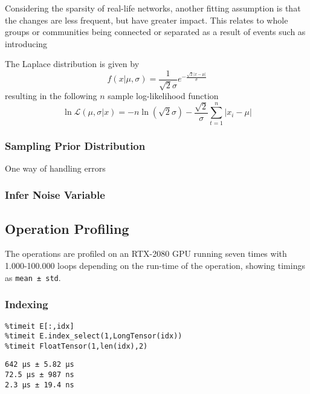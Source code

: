    Considering the sparsity of real-life networks, another fitting assumption is that the changes are less frequent, but have greater impact. This relates to whole groups or communities being connected or separated as a result of events such as introducing 
    

    The Laplace distribution is given by
    \begin{equation}
        f(x\vert\mu,\sigma)=\frac{1}{\sqrt{2}\sigma}e^{-\frac{\sqrt{2}|x-\mu|}{\sigma}}
    \end{equation}
    resulting in the following $n$ sample log-likelihood function
    \begin{equation}
        \ln\mathcal{L}(\mu,\sigma\vert x)=-n\ln(\sqrt{2}\sigma) -\frac{\sqrt{2}}{\sigma}\sum_{t=1}^n |x_i-\mu|
    \end{equation}
    
    
    \subsubsection{Sampling Prior Distribution}
    
        One way of handling errors 
    
    \subsubsection{Infer Noise Variable}
        
\subsection{Operation Profiling}

    The operations are profiled on an RTX-2080 GPU running seven times with 1.000-100.000 loops depending on the run-time of the operation, showing timings as \verb|mean ± std|.

    \subsubsection{Indexing}
        
        \begin{verbatim}
%timeit E[:,idx]
%timeit E.index_select(1,LongTensor(idx))
%timeit FloatTensor(1,len(idx),2)
        \end{verbatim}
        \begin{verbatim}
642 µs ± 5.82 µs
72.5 µs ± 987 ns
2.3 µs ± 19.4 ns
        \end{verbatim}
        
